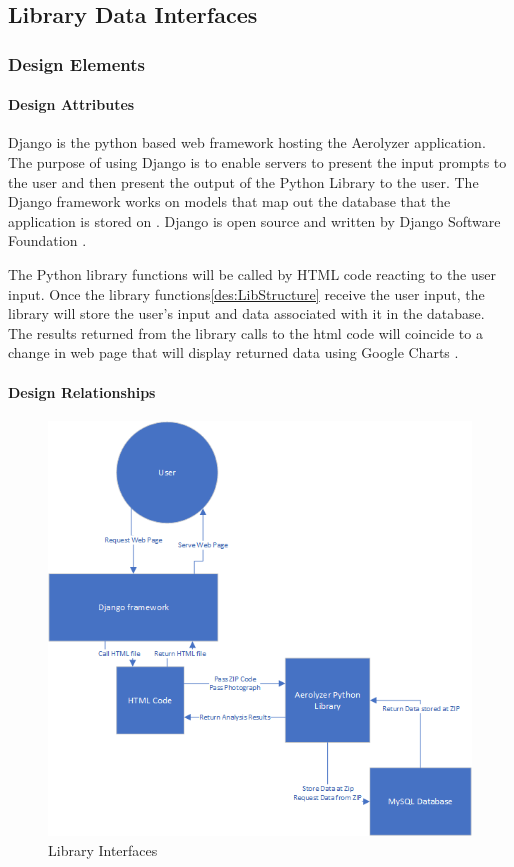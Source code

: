 \documentclass[onecolumn, draftclsnofoot,10pt, compsoc]{IEEEtran}
\begin{document}
\begin{singlespace}
	\subsection{Library Data Interfaces}
      \subsubsection{Design Elements}
          \paragraph{Design Attributes}
          Django is the python based web framework hosting the Aerolyzer application\cite{DjangoStart}.
          The purpose of using Django is to enable servers to present the input prompts to the user and then present the output of the Python Library to the user.
          The Django framework works on models that map out the database that the application is stored on \cite{DjangoDoc}.
          Django is open source and written by Django Software Foundation \cite{DjangoOver}.
		  
          The Python library functions will be called by HTML code reacting to the user input.
		  Once the library functions\ref{des:LibStructure} receive the user input, the library will store the user’s input and data associated with it in the database.
		  The results returned from the library calls to the html code will coincide to a change in web page that will display returned data using Google Charts \cite{GoogleCh}.
          \paragraph{Design Relationships}
            \begin{figure}[h]
            	\centering
                \includegraphics[width=4.5in,natwidth=600,natheight=588]{images/DesignInterface.png}
                \caption{Library Interfaces}
                \label{fig:1}
            \end{figure}

\end{singlespace}
\end{document}
